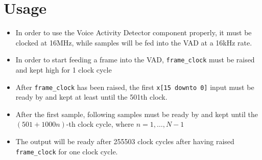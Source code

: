 \section{Usage}
\begin{itemize}
  \item In order to use the Voice Activity Detector component properly,
        it must be clocked at 16\si{\mega\hertz}, while samples will be fed
        into the VAD at a 16\si{\kilo\hertz} rate.
  \item In order to start feeding a frame into the VAD,
        \texttt{frame\_clock} must be raised and kept high for 1 clock cycle
  \item After \texttt{frame\_clock} has been raised,
        the first \texttt{x[15 downto 0]} input must be ready by
        and kept at least until the 501th clock.
  \item After the first sample, following samples must be ready by
        and kept until the $(501 + 1000n)$-th clock cycle, where
        $n = 1, \dots, N - 1$
  \item The output will be ready after 255503 clock cycles after having raised
        \texttt{frame\_clock} for one clock cycle.
\end{itemize}
